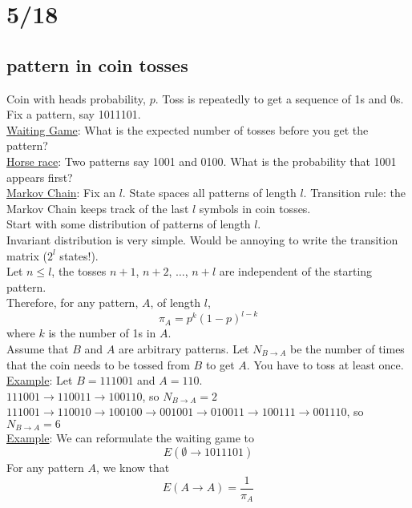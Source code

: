 \section*{5/18}
  \subsection*{pattern in coin tosses}
    Coin with heads probability, $p$. Toss is repeatedly to get a sequence of
    1s and 0s. Fix a pattern, say 1011101.\\
    \underline{Waiting Game}: What is the expected number of tosses before you
    get the pattern?\\
    \underline{Horse race}: Two patterns say 1001 and 0100. What is the 
    probability that 1001 appears first?\\
    \underline{Markov Chain}: Fix an $l$. State spaces all patterns of length $l$.
    Transition rule: the Markov Chain keeps track of the last $l$ symbols in coin
    tosses.\\
    Start with some distribution of patterns of length $l$.\\
    Invariant distribution is very simple. Would be annoying to write the transition
    matrix ($2^l$ states!).\\
    Let $n \le l$, the tosses $n + 1$, $n + 2$, $\ldots$, $n + l$ are independent
    of the starting pattern.\\
    Therefore, for any pattern, $A$, of length $l$,
    $$
      \pi_A = p^k(1 - p)^{l-k}
    $$
    where $k$ is the number of 1s in $A$.\\
    Assume that $B$ and $A$ are arbitrary patterns. Let $N_{B \to A}$ be the
    number of times that the coin needs to be tossed from $B$ to get $A$. You
    have to toss at least once.\\

    \noindent \underline{Example}: Let $B = 111001$ and $A = 110$.\\
      $111001 \to 110011 \to 100110$, so $N_{B \to A} = 2$\\
      $111001 \to 110010 \to 100100 \to 001001 \to 010011 \to 100111 \to 
      001110$, so $N_{B \to A} = 6$\\
   
    \noindent \underline{Example}: We can reformulate the waiting game to
    $$E(\emptyset \to 1011101)$$
    For any pattern $A$, we know that
    $$
      E(A \to A) = \frac{1}{\pi_A}
    $$

